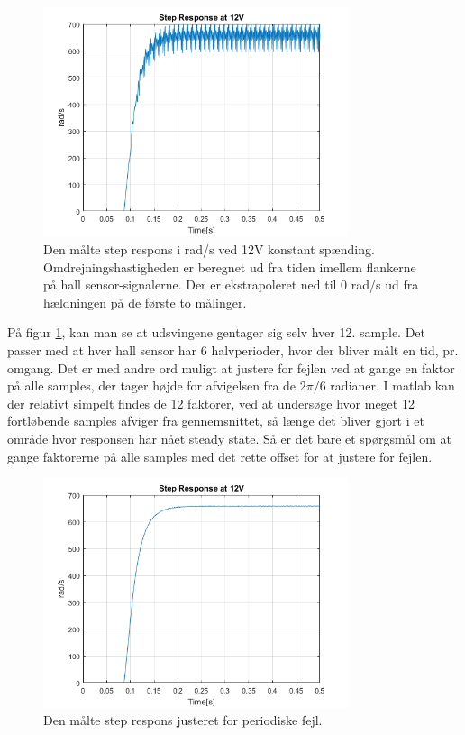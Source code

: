\begin{figure}[!ht]
	\begin{center}
		\includegraphics[width=0.8\textwidth]{Billeder/Untreated_Response.png}
	\end{center}
\caption{Den målte step respons i rad/s ved 12V konstant spænding. Omdrejningshastigheden er beregnet ud fra tiden imellem flankerne på hall sensor-signalerne. Der er ekstrapoleret ned til 0 rad/s ud fra hældningen på de første to målinger.}
\label{fig:Ubehandlet}
\end{figure}

På figur \ref{fig:Ubehandlet}, kan man se at udsvingene gentager sig selv hver 12. sample. Det passer med at hver hall sensor har 6 halvperioder, hvor der bliver målt en tid, pr. omgang. Det er med andre ord muligt at justere for fejlen ved at gange en faktor på alle samples, der tager højde for afvigelsen fra de $2\pi/6$ radianer. I matlab kan der relativt simpelt findes de 12 faktorer, ved at undersøge hvor meget 12 fortløbende samples afviger fra gennemsnittet, så længe det bliver gjort i et område hvor responsen har nået steady state. Så er det bare et spørgsmål om at gange faktorerne på alle samples med det rette offset for at justere for fejlen. 

\begin{figure}[!ht]
	\begin{center}
		\includegraphics[width=0.8\textwidth]{Billeder/Treated_Response.png}
	\end{center}
\caption{Den målte step respons justeret for periodiske fejl.}
\label{fig:Behandlet}
\end{figure}


